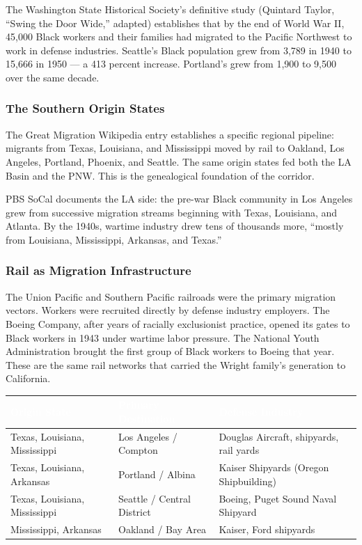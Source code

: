 \documentclass[11pt,letterpaper]{article}
\newcommand{\tableheader}[1]{\textbf{\sffamily\textcolor{white}{#1}}}
\begin{document}
The Washington State Historical Society's definitive study (Quintard Taylor, ``Swing the Door Wide,'' adapted) establishes that by the end of World War II, 45,000 Black workers and their families had migrated to the Pacific Northwest to work in defense industries. Seattle's Black population grew from 3,789 in 1940 to 15,666 in 1950 --- a 413 percent increase. Portland's grew from 1,900 to 9,500 over the same decade.

\subsubsection{The Southern Origin States}

The Great Migration Wikipedia entry establishes a specific regional pipeline: migrants from Texas, Louisiana, and Mississippi moved by rail to Oakland, Los Angeles, Portland, Phoenix, and Seattle. The same origin states fed both the LA Basin and the PNW. This is the genealogical foundation of the corridor.

PBS SoCal documents the LA side: the pre-war Black community in Los Angeles grew from successive migration streams beginning with Texas, Louisiana, and Atlanta. By the 1940s, wartime industry drew tens of thousands more, ``mostly from Louisiana, Mississippi, Arkansas, and Texas.''

\subsubsection{Rail as Migration Infrastructure}

The Union Pacific and Southern Pacific railroads were the primary migration vectors. Workers were recruited directly by defense industry employers. The Boeing Company, after years of racially exclusionist practice, opened its gates to Black workers in 1943 under wartime labor pressure. The National Youth Administration brought the first group of Black workers to Boeing that year. These are the same rail networks that carried the Wright family's generation to California.

\begin{center}
\begin{tabularx}{\textwidth}{L{3cm}L{3cm}X}
\toprule
{}
\tableheader{Origin State} & \tableheader{Primary Destination} & \tableheader{Defense Industry} \\
\midrule
Texas, Louisiana, Mississippi & Los Angeles / Compton & Douglas Aircraft, shipyards, rail yards \\
Texas, Louisiana, Arkansas & Portland / Albina & Kaiser Shipyards (Oregon Shipbuilding) \\
Texas, Louisiana, Mississippi & Seattle / Central District & Boeing, Puget Sound Naval Shipyard \\
Mississippi, Arkansas & Oakland / Bay Area & Kaiser, Ford shipyards \\
\bottomrule
\end{tabularx}
\end{center}
\end{document}
